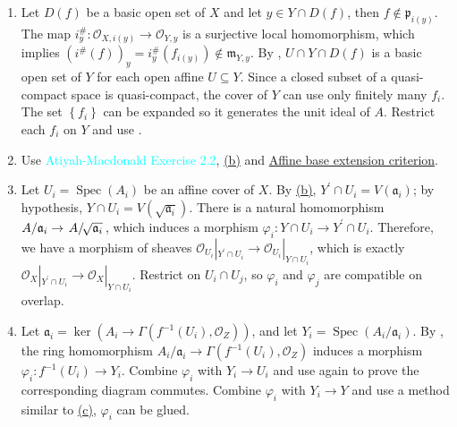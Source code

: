 \begin{exercise}\label{ex3.11}
	\begin{enumerate}[label=(\alph*),ref=\theexercise(\alph*)]
		\textcolor{red}{\hyperref[ex3.11.2]{(b)} is required for \hyperref[ex3.11.2]{(a)} for the gluing part.}
		\addtocounter{enumi}{1}
		\item\label{ex3.11.2} Let $D(f)$ be a basic open set of $X$ and let $y\in Y\cap D(f)$, then $f\notin\mathfrak{p}_{i(y)}$. The map $i_y^\#:\mathcal{O}_{X,i(y)}\rightarrow\mathcal{O}_{Y,y}$ is a surjective local homomorphism, which implies $\left(i^\#(f)\right)_y=i_y^\#\!\left(f_{i(y)}\right)\notin\mathfrak{m}_{Y,y}$. By , $U\cap Y\cap D(f)$ is a basic open set of $Y$ for each open affine $U\subseteq Y$. Since a closed subset of a quasi-compact space is quasi-compact, the cover of $Y$ can use only finitely many $f_i$. The set $\left\{f_i\right\}$ can be expanded so it generates the unit ideal of $A$. Restrict each $f_i$ on $Y$ and use .
		\addtocounter{enumi}{-2}
		\item\label{ex3.11.1} Use \textcolor{cyan}{Atiyah-Macdonald Exercise 2.2}, \hyperref[ex3.11.2]{(b)} and \hyperref[affinebaseext]{Affine base extension criterion}.
		\addtocounter{enumi}{1}
		\item\label{ex3.11.3} Let $U_i=\operatorname{Spec}\!\left(A_i\right)$ be an affine cover of $X$. By \hyperref[ex3.11.2]{(b)}, $Y^\prime\cap U_i=V\!\left(\mathfrak{a}_i\right)$; by hypothesis, $Y\cap U_i=V\!\left(\!\sqrt{\mathfrak{a}_i}\right)$. There is a natural homomorphism $A/\mathfrak{a}_i\rightarrow\left.A\middle/\!\sqrt{\mathfrak{a}_i}\right.$, which induces a morphism $\varphi_i:Y\cap U_i\rightarrow Y^\prime\cap U_i$. Therefore, we have a morphism of sheaves $\mathcal{O}_{U_i}|_{Y^\prime\cap U_i}\rightarrow\mathcal{O}_{U_i}|_{Y\cap U_i}$, which is exactly $\mathcal{O}_X|_{Y^\prime\cap U_i}\rightarrow\mathcal{O}_X|_{Y\cap U_i}$. Restrict on $U_i\cap U_j$, so $\varphi_i$ and $\varphi_j$ are compatible on overlap.
		\item\label{ex3.11.4} Let $\mathfrak{a}_i=\ker\!\left(A_i\rightarrow\Gamma\!\left(f^{-1}\!\left(U_i\right),\mathcal{O}_Z\right)\right)$, and let $Y_i=\operatorname{Spec}\!\left(A_i/\mathfrak{a}_i\right)$. By , the ring homomorphism $A_i/\mathfrak{a}_i\rightarrow\Gamma\!\left(f^{-1}\!\left(U_i\right),\mathcal{O}_Z\right)$ induces a morphism $\varphi_i:f^{-1}\!\left(U_i\right)\rightarrow Y_i$. Combine $\varphi_i$ with $Y_i\rightarrow U_i$ and use  again to prove the corresponding diagram commutes. Combine $\varphi_i$ with $Y_i\rightarrow Y$ and use a method similar to \hyperref[ex3.11.3]{(c)}, $\varphi_i$ can be glued.
	\end{enumerate}
\end{exercise}

